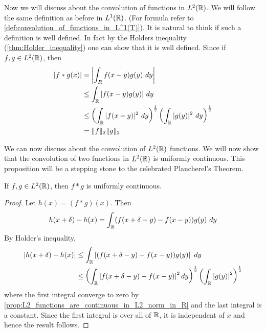 Now we will discuss about the convolution of functions in $L^2(\mathbb R)$. We will follow the same definition as before in $L^1(\mathbb R)$. (For formula refer to \autoref{def:convolution_of_functions_in_L^1(T)}). It is natural to think if such a definition is well defined. In fact by the Holders inequality (\autoref{thm:Holder_inequality}) one can show that it is well defined. Since if $f, g \in L^2(\mathbb R)$, then 
  \begin{align*}
    |f*g(x)| &= \left|\int_R f(x-y)g(y) \ dy \right|\\
        &\le \int_\mathbb R |f(x-y)g(y)| \ dy \\
        &\le \left(\int_\mathbb R |f(x-y)|^2 \ dy \right)^{\frac{1}{2}} \left(\int_\mathbb R |g(y)|^2 \ dy \right)^{\frac{1}{2}} \\
        &= \|f\|_2 \|g\|_2
  \end{align*}

We can now discuss about the convolution of $L^2(\mathbb R)$ functions. We will now show that the convolution of two functions in $L^2(\mathbb R)$ is uniformly continuous. This proposition will be a stepping stone to the celebrated Plancherel's Theorem.

  \begin{proposition}
    If $f, g \in L^2(\mathbb R)$, then $f*g$ is uniformly continuous.
  \end{proposition}
  \begin{proof}
    Let $h(x) = (f*g)(x)$. Then $$h(x+\delta) - h(x) = \int_\mathbb R (f(x+\delta - y) - f(x-y)) g(y) \ dy$$
    By Holder's inequality, 
    \begin{align*}
      |h(x+\delta) - h(x)| &\le \int_\mathbb R \left|(f(x+\delta - y) - f(x-y)) g(y) \right| \ dy \\
      &\le \left( \int_\mathbb R \left|f(x+\delta - y) - f(x-y) \right|^2 dy\right)^{\frac{1}{2}} \left( \int_\mathbb R \left|g(y)\right|^2 \right)^{\frac{1}{2}}
    \end{align*}
    where the first integral converge to zero by \autoref{prop:L2_functions_are_continuous_in_L2_norm_in_R} and the last integral is a constant. Since the first integral is over all of $\mathbb R$, it is independent of $x$ and hence the result follows.
  \end{proof}


